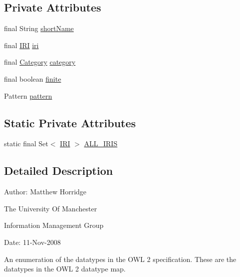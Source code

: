 \subsection*{Private Attributes}
\begin{DoxyCompactItemize}
\item 
final String \hyperlink{enumorg_1_1semanticweb_1_1owlapi_1_1vocab_1_1_o_w_l2_datatype_a71c126238b4d6eeb14f8ecf1ebd81d5c}{short\-Name}
\item 
final \hyperlink{classorg_1_1semanticweb_1_1owlapi_1_1model_1_1_i_r_i}{I\-R\-I} \hyperlink{enumorg_1_1semanticweb_1_1owlapi_1_1vocab_1_1_o_w_l2_datatype_a2b5d28a40f9e82cce567cc4038ae2a39}{iri}
\item 
final \hyperlink{enumorg_1_1semanticweb_1_1owlapi_1_1vocab_1_1_o_w_l2_datatype_1_1_category}{Category} \hyperlink{enumorg_1_1semanticweb_1_1owlapi_1_1vocab_1_1_o_w_l2_datatype_a45d3db6d61e64de97c6e2b4bd1793f03}{category}
\item 
final boolean \hyperlink{enumorg_1_1semanticweb_1_1owlapi_1_1vocab_1_1_o_w_l2_datatype_a8a9285b973af285aabba8a1dc92b26ff}{finite}
\item 
Pattern \hyperlink{enumorg_1_1semanticweb_1_1owlapi_1_1vocab_1_1_o_w_l2_datatype_abc20f3e081271ef13319e747a440f208}{pattern}
\end{DoxyCompactItemize}
\subsection*{Static Private Attributes}
\begin{DoxyCompactItemize}
\item 
static final Set$<$ \hyperlink{classorg_1_1semanticweb_1_1owlapi_1_1model_1_1_i_r_i}{I\-R\-I} $>$ \hyperlink{enumorg_1_1semanticweb_1_1owlapi_1_1vocab_1_1_o_w_l2_datatype_abe559c16e0c03cc83da3734b978ab5d0}{A\-L\-L\-\_\-\-I\-R\-I\-S}
\end{DoxyCompactItemize}


\subsection{Detailed Description}
Author\-: Matthew Horridge\par
 The University Of Manchester\par
 Information Management Group\par
 Date\-: 11-\/\-Nov-\/2008\par
\par
 An enumeration of the datatypes in the O\-W\-L 2 specification. These are the datatypes in the O\-W\-L 2 datatype map. 

